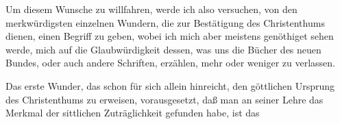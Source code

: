 \begin{aufza}
\item Um diesem Wunsche zu willfahren, werde ich also versuchen, von den merkwürdigsten einzelnen Wundern, die zur Bestätigung des Christenthums dienen, einen Begriff zu geben, wobei ich mich aber meistens genöthiget sehen werde, mich auf die Glaubwürdigkeit dessen, was uns die Bücher des neuen Bundes, oder auch andere Schriften, erzählen, mehr oder weniger zu verlassen.
\end{aufza}


Das erste Wunder, das schon für sich allein hinreicht, den göttlichen Ursprung des Christenthums zu erweisen, vorausgesetzt, daß man an seiner Lehre das Merkmal der sittlichen Zuträglichkeit gefunden habe, ist das ~
